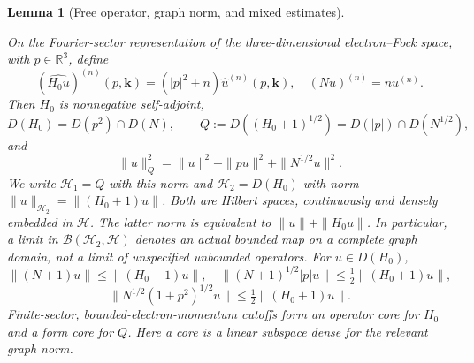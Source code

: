 \documentclass[11pt,a4paper]{article}
\newtheorem{lemma}[theorem]{Lemma}
\theoremstyle{definition}
\theoremstyle{remark}
\newcommand{\proofid}[1]{\par\smallskip{\normalfont\scriptsize\color{inkblue}Stable ID: \nolinkurl{#1}}\par\smallskip}
\begin{document}
\begin{lemma}[Free operator, graph norm, and mixed estimates]
\label{basic:free}
\proofid{basic:free}
\par{}\par\smallskip

On the Fourier-sector representation of the three-dimensional electron--Fock space, with $p\in\mathbb R^3$, define
\[
 (\widehat{H_0u})^{(n)}(p,\mathbf k)=(|p|^2+n)\widehat u^{(n)}(p,\mathbf k),
 \quad (Nu)^{(n)}=nu^{(n)}.
\]
Then $H_0$ is nonnegative self-adjoint,
\[
 D(H_0)=D(p^2)\cap D(N),\qquad
 Q:=D((H_0+1)^{1/2})=D(|p|)\cap D(N^{1/2}),
\]
and
\[
 \|u\|_Q^2=\|u\|^2+\|pu\|^2+\|N^{1/2}u\|^2.
\]
We write $\mathcal H_1=Q$ with this norm and
$\mathcal H_2=D(H_0)$ with norm
$\|u\|_{\mathcal H_2}=\|(H_0+1)u\|$. Both are Hilbert spaces,
continuously and densely embedded in $\mathcal H$. The latter norm
is equivalent to $\|u\|+\|H_0u\|$. In particular, a limit in
$\mathcal B(\mathcal H_2,\mathcal H)$ denotes an actual bounded map
on a complete graph domain, not a limit of unspecified unbounded
operators.
For $u\in D(H_0)$,
\[
 \|(N+1)u\|\leq\|(H_0+1)u\|,\quad
 \|(N+1)^{1/2}|p|u\|\leq\tfrac12\|(H_0+1)u\|,
\]
\[
 \|N^{1/2}(1+p^2)^{1/2}u\|\leq\tfrac12\|(H_0+1)u\|.
\]
Finite-sector, bounded-electron-momentum cutoffs form an operator core for
$H_0$ and a form core for $Q$. Here a core is a linear subspace dense for
the relevant graph norm.
\end{lemma}
\end{document}
